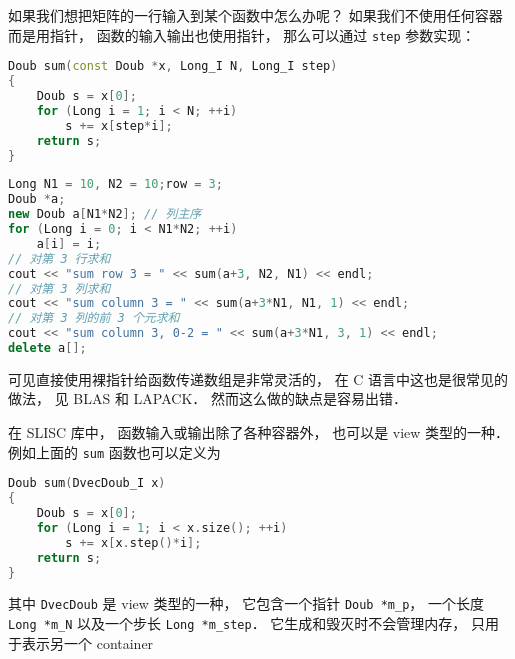

如果我们想把矩阵的一行输入到某个函数中怎么办呢？ 如果我们不使用任何容器而是用指针， 函数的输入输出也使用指针， 那么可以通过 \verb|step| 参数实现：
\begin{lstlisting}[language=cpp]
Doub sum(const Doub *x, Long_I N, Long_I step)
{
    Doub s = x[0];
    for (Long i = 1; i < N; ++i)
        s += x[step*i];
    return s;
}
\end{lstlisting}

\begin{lstlisting}[language=cpp]
Long N1 = 10, N2 = 10;row = 3;
Doub *a;
new Doub a[N1*N2]; // 列主序
for (Long i = 0; i < N1*N2; ++i)
    a[i] = i;
// 对第 3 行求和
cout << "sum row 3 = " << sum(a+3, N2, N1) << endl;
// 对第 3 列求和
cout << "sum column 3 = " << sum(a+3*N1, N1, 1) << endl;
// 对第 3 列的前 3 个元求和
cout << "sum column 3, 0-2 = " << sum(a+3*N1, 3, 1) << endl;
delete a[];
\end{lstlisting}

可见直接使用裸指针给函数传递数组是非常灵活的， 在 C 语言中这也是很常见的做法， 见 BLAS 和 LAPACK． 然而这么做的缺点是容易出错．

在 SLISC 库中， 函数输入或输出除了各种容器外， 也可以是 view 类型的一种． 例如上面的 \verb|sum| 函数也可以定义为
\begin{lstlisting}[language=cpp]
Doub sum(DvecDoub_I x)
{
    Doub s = x[0];
    for (Long i = 1; i < x.size(); ++i)
        s += x[x.step()*i];
    return s;
}
\end{lstlisting}
其中 \verb|DvecDoub| 是 view 类型的一种， 它包含一个指针 \verb|Doub *m_p|， 一个长度 \verb|Long *m_N| 以及一个步长 \verb|Long *m_step|． 它生成和毁灭时不会管理内存， 只用于表示另一个 container

